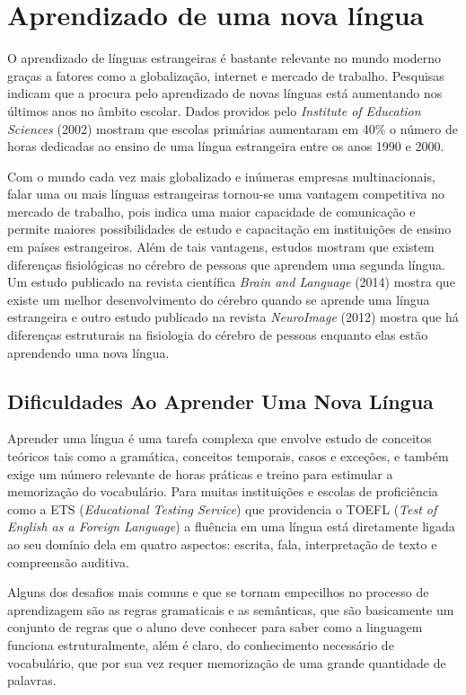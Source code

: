 \chapter{Aprendizado de uma nova língua}
\label{chap:cap2}
O aprendizado de línguas estrangeiras é bastante relevante no mundo moderno graças a fatores como a globalização, internet e mercado de trabalho. Pesquisas indicam que a procura pelo aprendizado de novas línguas está aumentando nos últimos anos no âmbito escolar. Dados providos pelo \textit{Institute of Education Sciences} (2002) mostram que escolas primárias aumentaram em 40\% o número de horas dedicadas ao ensino de uma língua estrangeira entre os anos 1990 e 2000.~\nocite{*}


Com o mundo cada vez mais globalizado e inúmeras empresas multinacionais, falar uma ou mais línguas estrangeiras tornou-se uma vantagem competitiva no mercado de trabalho, pois indica uma maior capacidade de comunicação e permite maiores possibilidades de estudo e capacitação em instituições de ensino em países estrangeiros. Além de tais vantagens, estudos mostram que existem diferenças fisiológicas no cérebro de pessoas que aprendem uma segunda língua. Um estudo publicado na revista científica \textit{Brain and Language} (2014) mostra que existe um melhor desenvolvimento do cérebro quando se aprende uma língua estrangeira e outro estudo publicado na revista \textit{NeuroImage} (2012) mostra que há diferenças estruturais na fisiologia do cérebro de pessoas enquanto elas estão aprendendo uma nova língua.


\section{Dificuldades Ao Aprender Uma Nova Língua}
\label{sec:dificuldades}
Aprender uma língua é uma tarefa complexa que envolve estudo de conceitos teóricos tais como a gramática, conceitos temporais, casos e exceções, e também exige um número relevante de horas práticas e treino para estimular a memorização do vocabulário. Para muitas instituições e escolas de proficiência como a ETS (\textit{Educational Testing Service}) que providencia o TOEFL (\textit{Test of English as a Foreign Language}) a fluência em uma língua está diretamente ligada ao seu domínio dela em quatro aspectos: escrita, fala, interpretação de texto e compreensão auditiva.

Alguns dos desafios mais comuns e que se tornam empecilhos no processo de aprendizagem são as regras gramaticais e as semânticas, que são basicamente um conjunto de regras que o aluno deve conhecer para saber como a linguagem funciona estruturalmente, além é claro, do conhecimento necessário de vocabulário, que por sua vez requer memorização de uma grande quantidade de palavras.

